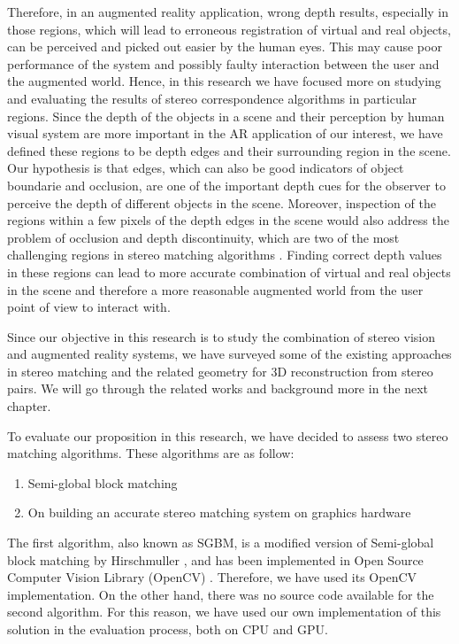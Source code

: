 \documentclass[dvips,letterpaper,12pt]{report}
\begin{document}
Therefore, in an augmented reality application, wrong depth results, especially in those regions, which will lead to erroneous registration of virtual and real objects, 
can be perceived and picked out easier by the human eyes. This may cause poor performance of the system and possibly faulty interaction between 
the user and the augmented world. 
Hence, in this research we have focused more on studying and evaluating the results of stereo correspondence algorithms in particular regions. Since the depth of the objects 
in a scene and their perception by human visual system are more important in the AR application of our interest, we have 
defined these regions to be depth edges and their surrounding region in the scene.
Our hypothesis is that edges, which can also be good indicators of object boundarie and occlusion, are one of the important depth cues for the observer 
to perceive the depth of different objects in the scene. 
Moreover, inspection of the regions within a few pixels of the depth edges in the scene would also address the problem of occlusion and depth discontinuity, which are two of
the most challenging regions in stereo matching algorithms \cite{sch02}.
Finding correct depth values in these 
regions can lead to more accurate combination of virtual and real objects in the scene and therefore a more reasonable augmented world from the user point of view to interact with. \newline
\newline

Since our objective in this research is to study the combination of stereo vision and augmented reality systems, we have surveyed some of the existing approaches in stereo matching and the
related geometry for 3D reconstruction from stereo pairs. We will go through the related works and background more in the next chapter. 

To evaluate our proposition in this research, we have decided to assess two stereo matching algorithms. These algorithms are as follow:
\begin{enumerate}
\item Semi-global block matching
\item On building an accurate stereo matching system on graphics hardware \cite{mei11}
\end{enumerate}

The first algorithm, also known as SGBM, is a modified version of Semi-global block matching by Hirschmuller \cite{hir08}, 
and has been implemented in Open Source Computer Vision Library (OpenCV) \cite{sgbm}. Therefore, we have used its OpenCV implementation. 
On the other hand, there was no source code available for the second algorithm. For this reason, we have used our own implementation of this solution in the evaluation process, both on CPU and GPU.
\end{document}
